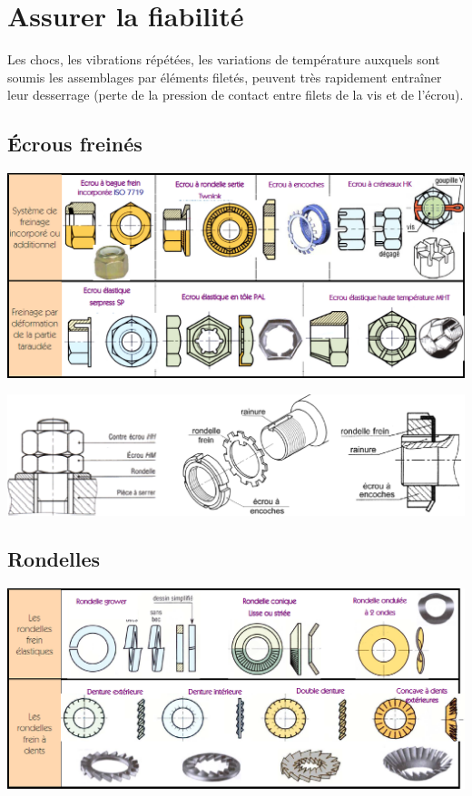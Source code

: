 \documentclass[11pt,oneside]{article}
\begin{document}
\section{Assurer la fiabilité}
Les chocs, les vibrations répétées, les variations de température auxquels sont soumis les assemblages par
éléments filetés, peuvent très rapidement entraîner leur desserrage (perte de la pression de contact entre
filets de la vis et de l'écrou).


\subsection{Écrous freinés}
\begin{center}
\includegraphics[width=.8\textwidth]{png/ecrous_2}
\end{center}

\begin{center}
\includegraphics[width=.8\textwidth]{png/ecrous_3}
\end{center}

\subsection{Rondelles}

\begin{center}
\includegraphics[width=.8\textwidth]{png/rondelles}
\end{center}
\end{document}
